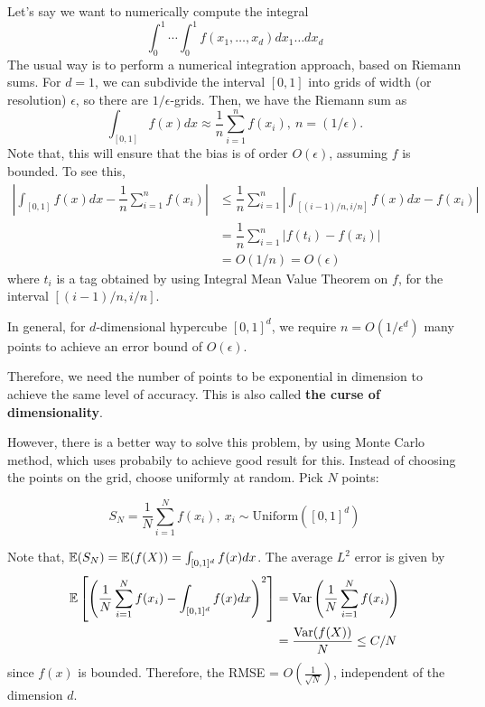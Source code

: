 \documentclass[12pt]{article}
\begin{document}
\begin{example}
    Let's say we want to numerically compute the integral
    \begin{equation*}
        \int_0^1 \cdots \int_0^1 f(x_1, \ldots, x_d) dx_1 \ldots dx_d
    \end{equation*}
    The usual way is to perform a numerical integration approach, based on Riemann sums. For $d = 1$, we can subdivide the interval $[0, 1]$ into grids of width (or resolution) $\epsilon$, so there are $1/\epsilon$-grids. Then, we have the Riemann sum as
    \begin{equation*}
        \int_{[0, 1]} f(x)dx \approx \dfrac{1}{n}\sum_{i=1}^n f(x_i), \ n = (1/\epsilon).
    \end{equation*}
    \noindent Note that, this will ensure that the bias is of order $O(\epsilon)$, assuming $f$ is bounded. To see this,
    \begin{align*}
        \left\vert \int_{[0, 1]} f(x)dx - \dfrac{1}{n}\sum_{i=1}^n f(x_i) \right\vert
         & \leq \dfrac{1}{n}\sum_{i=1}^{n} \left\vert \int_{[(i-1)/n, i/n]} f(x)dx - f(x_i) \right\vert \\
         & = \dfrac{1}{n}\sum_{i=1}^{n} \left\vert f(t_i) - f(x_i) \right\vert                          \\
         & = O(1/n) = O(\epsilon)
    \end{align*}
    \noindent where $t_i$ is a tag obtained by using Integral Mean Value Theorem on $f$, for the interval $[(i-1)/n, i/n]$.

    In general, for $d$-dimensional hypercube $[0, 1]^d$, we require $n = O(1/\epsilon^d)$ many points to achieve an error bound of $O(\epsilon)$.
\end{example}

Therefore, we need the number of points to be exponential in dimension to achieve the same level of accuracy. This is also called \textbf{the curse of dimensionality}.

However, there is a better way to solve this problem, by using Monte Carlo method, which uses probabily to achieve good result for this. Instead of choosing the points on the grid, choose uniformly at random. Pick $N$ points:

\begin{equation*}
    S_N = \dfrac{1}{N}\sum_{i=1}^N f(x_i), \ x_i \sim \text{Uniform}([0, 1]^d)
\end{equation*}

Note that, $\mathbb{E}(S_N) = \mathbb{E}(f(X)) = \int_{[0, 1]^d} f(x)dx$. The average $L^2$ error is given by
\begin{align*}
    \mathbb{E}\left[\left(\frac{1}{N} \sum_{i=1}^N f(x_i) - \int_{[0,1]^d} f(x) dx\right)^2 \right]
     & = \mathrm{Var}\left( \frac{1}{N} \sum_{i=1}^N f(x_i) \right) \\
     & = \dfrac{\mathrm{Var}(f(X))}{N} \leq C/N
\end{align*}
\noindent since $f(x)$ is bounded. Therefore, the RMSE = $O(\frac{1}{\sqrt{N}})$, independent of the dimension $d$.
\end{document}
